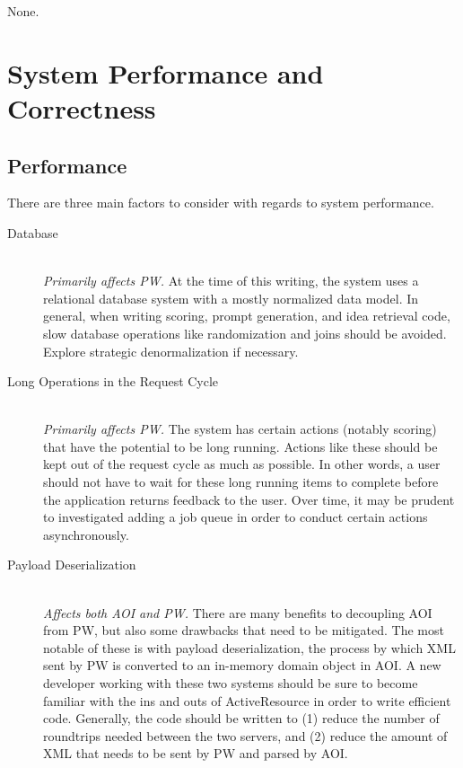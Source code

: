 \documentclass[11pt]{book}
\begin{document}
None.








\chapter{System Performance and Correctness}

\section{Performance}

There are three main factors to consider with regards to system performance.

\begin{description}
	\item[Database]  \hfill \\
  \emph{Primarily affects PW.}  At the time of this writing, the system uses a relational database system with a mostly normalized data model.  In general, when writing scoring, prompt generation, and idea retrieval code, slow database operations like randomization and joins should be avoided.  Explore strategic denormalization if necessary.
  	\item[Long Operations in the Request Cycle]  \hfill \\
  \emph{Primarily affects PW.}  The system has certain actions (notably scoring) that have the potential to be long running.  Actions like these should be kept out of the request cycle as much as possible.  In other words, a user should not have to wait for these long running items to complete before the application returns feedback to the user.  Over time, it may be prudent to investigated adding a job queue in order to conduct certain actions asynchronously.
	\item[Payload Deserialization]  \hfill \\
  \emph{Affects both AOI and PW.}  There are many benefits to decoupling AOI from PW, but also some drawbacks that need to be mitigated.  The most notable of these is with payload deserialization, the process by which XML sent by PW is converted to an in-memory domain object in AOI.  A new developer working with these two systems should be sure to become familiar with the ins and outs of ActiveResource in order to write efficient code. Generally, the code should be written to (1) reduce the number of roundtrips needed between the two servers, and (2) reduce the amount of XML that needs to be sent by PW and parsed by AOI.
\end{description}
\end{document}
